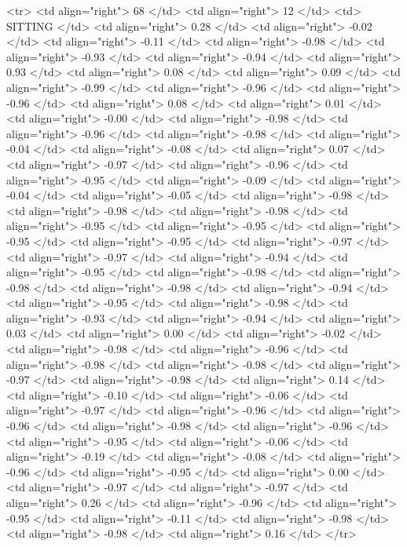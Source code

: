   <tr> <td align="right"> 68 </td> <td align="right">  12 </td> <td> SITTING </td> <td align="right"> 0.28 </td> <td align="right"> -0.02 </td> <td align="right"> -0.11 </td> <td align="right"> -0.98 </td> <td align="right"> -0.93 </td> <td align="right"> -0.94 </td> <td align="right"> 0.93 </td> <td align="right"> 0.08 </td> <td align="right"> 0.09 </td> <td align="right"> -0.99 </td> <td align="right"> -0.96 </td> <td align="right"> -0.96 </td> <td align="right"> 0.08 </td> <td align="right"> 0.01 </td> <td align="right"> -0.00 </td> <td align="right"> -0.98 </td> <td align="right"> -0.96 </td> <td align="right"> -0.98 </td> <td align="right"> -0.04 </td> <td align="right"> -0.08 </td> <td align="right"> 0.07 </td> <td align="right"> -0.97 </td> <td align="right"> -0.96 </td> <td align="right"> -0.95 </td> <td align="right"> -0.09 </td> <td align="right"> -0.04 </td> <td align="right"> -0.05 </td> <td align="right"> -0.98 </td> <td align="right"> -0.98 </td> <td align="right"> -0.98 </td> <td align="right"> -0.95 </td> <td align="right"> -0.95 </td> <td align="right"> -0.95 </td> <td align="right"> -0.95 </td> <td align="right"> -0.97 </td> <td align="right"> -0.97 </td> <td align="right"> -0.94 </td> <td align="right"> -0.95 </td> <td align="right"> -0.98 </td> <td align="right"> -0.98 </td> <td align="right"> -0.98 </td> <td align="right"> -0.94 </td> <td align="right"> -0.95 </td> <td align="right"> -0.98 </td> <td align="right"> -0.93 </td> <td align="right"> -0.94 </td> <td align="right"> 0.03 </td> <td align="right"> 0.00 </td> <td align="right"> -0.02 </td> <td align="right"> -0.98 </td> <td align="right"> -0.96 </td> <td align="right"> -0.98 </td> <td align="right"> -0.98 </td> <td align="right"> -0.97 </td> <td align="right"> -0.98 </td> <td align="right"> 0.14 </td> <td align="right"> -0.10 </td> <td align="right"> -0.06 </td> <td align="right"> -0.97 </td> <td align="right"> -0.96 </td> <td align="right"> -0.96 </td> <td align="right"> -0.98 </td> <td align="right"> -0.96 </td> <td align="right"> -0.95 </td> <td align="right"> -0.06 </td> <td align="right"> -0.19 </td> <td align="right"> -0.08 </td> <td align="right"> -0.96 </td> <td align="right"> -0.95 </td> <td align="right"> 0.00 </td> <td align="right"> -0.97 </td> <td align="right"> -0.97 </td> <td align="right"> 0.26 </td> <td align="right"> -0.96 </td> <td align="right"> -0.95 </td> <td align="right"> -0.11 </td> <td align="right"> -0.98 </td> <td align="right"> -0.98 </td> <td align="right"> 0.16 </td> </tr>
